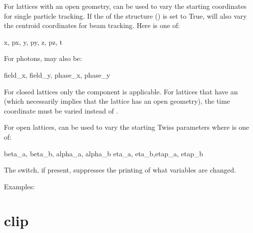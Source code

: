 For lattices with an open geometry,  can be used to
vary the starting coordinates for single particle tracking. If the
 of the  structure () is set to
True,  will also vary the centroid coordinates for beam tracking. Here
 is one of:
\begin{example}
  x, px, y, py, z, pz, t
\end{example}
For photons,  may also be:
\begin{example}
  field_x, field_y, phase_x, phase_y
\end{example}
For closed lattices only the  component is applicable. For lattices that have an
 (which necessarily implies that the lattice has an open geometry), the time
 coordinate must be varied instead of .

For open lattices,  can be used to vary the starting
Twiss parameters where  is one of:
\begin{example}
  beta_a, beta_b, alpha_a, alpha_b 
  eta_a, eta_b,etap_a, etap_b    
\end{example}

The  switch, if present, suppresses the printing of what variables are
changed.

Examples:


\section{clip}
\label{s:clip}

